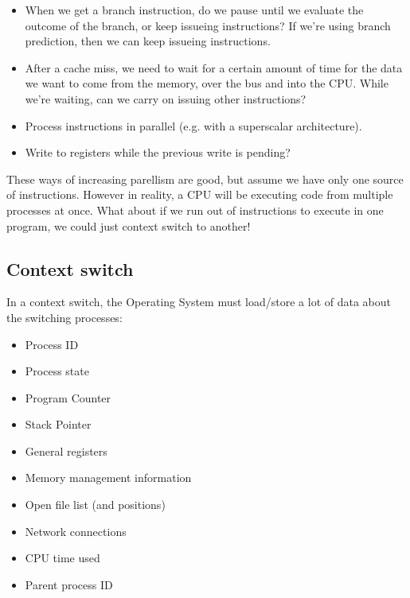 \begin{itemize}
  \item When we get a branch instruction, do we pause until we evaluate the
  outcome of the branch, or keep issueing instructions? If we're using branch
  prediction, then we can keep issueing instructions.

  \item After a cache miss, we need to wait for a certain amount of time for the
  data we want to come from the memory, over the bus and into the CPU. While
  we're waiting, can we carry on issuing other instructions?

  \item Process instructions in parallel (e.g. with a superscalar architecture).

  \item Write to registers while the previous write is pending?
\end{itemize}

These ways of increasing parellism are good, but assume we have only one source
of instructions. However in reality, a CPU will be executing code from multiple
processes at once. What about if we run out of instructions to execute in one
program, we could just context switch to another!

\subsection{Context switch}

In a context switch, the Operating System must load/store a lot of data about
the switching processes:

\begin{mymulticols}
  \begin{itemize}
    \item Process ID
    \item Process state
    \item Program Counter
    \item Stack Pointer
    \item General registers
    \item Memory management information
    \item Open file list (and positions)
    \item Network connections
    \item CPU time used
    \item Parent process ID
  \end{itemize}
\end{mymulticols}

